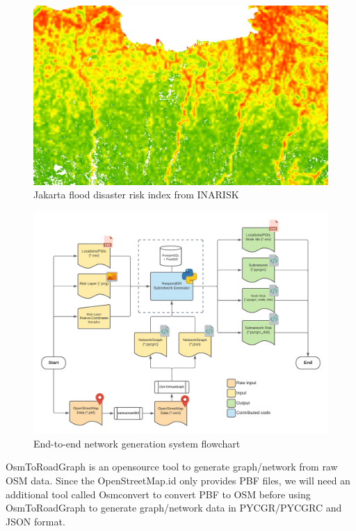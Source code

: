 \documentclass[conference]{IEEEtran}
\begin{document}
\begin{figure}
\centerline{\includegraphics[scale=0.35]{jakarta_flood_risk_layer_inarisk.png}}
\caption{Jakarta flood disaster risk index from INARISK}
\label{fig_jakarta_flood_risk_layer_inarisk}
\end{figure}

\begin{figure}
\centerline{\includegraphics[scale=0.6]{system-flowchart.png}}
\caption{End-to-end network generation system flowchart}
\label{fig_system_flowchart}
\end{figure}

OsmToRoadGraph\cite{Gemsa2017OsmToRoadGraph} is an opensource tool to generate graph/network from raw OSM data. Since the OpenStreetMap.id only provides PBF files, we will need an additional tool called Osmconvert\cite{OpenStreetMap2019OsmConvert} to convert PBF to OSM before using OsmToRoadGraph to generate graph/network data in PYCGR/PYCGRC and JSON format.
\end{document}
